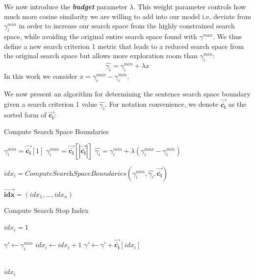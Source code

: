 \documentclass[12pt]{article}
\begin{document}
We now introduce the \textit{\textbf{budget}} parameter $\lambda$. This weight parameter controls how much more cosine similarity we are willing to add into our model i.e. deviate from $\gamma_{i}^{min}$ in order to increase our search space from the highly constrained search space, while avoiding the original entire search space found with $\gamma^{max}$. We thus define a new search criterion 1 metric that leads to a reduced search space from the original search space but allows more exploration room than $\gamma_{i}^{min}$: \[\hat{\gamma_{i}} = \gamma_{i}^{min} + \lambda x\]
In this work we consider $x = \gamma_{i}^{max}-\gamma_{i}^{min}$.

We now present an algorithm for determining the sentence search space boundary given a search criterion 1 value $\hat{\gamma_{i}}$. For notation convenience, we denote $\bm{\vec{\bar{c_i}}}$ as the sorted form of $\bm{\vec{c_i}}$:

\begin{algorithm}[H]
\caption{Compute Search Space Boundaries}
\begin{algorithmic}[1]
\State$ \gamma_{i}^{min} = \bm{\vec{\bar{c_i}}}[1]$
\State$ \gamma_{i}^{max} = \bm{\vec{\bar{c_i}}}[| \bm{\vec{\bar{c_i}}}|]$
\State$ \hat{\gamma_{i}} = \gamma_{i}^{min} + \lambda(\gamma_{i}^{max} - \gamma_{i}^{min})$

\State $idx_i = \textit{ComputeSearchSpaceBoundaries}(\gamma_{i}^{min}, \hat{\gamma_{i}}, \bm{\vec{\bar{c_i}}})$
 \EndFor




\Return $\bm{\vec{idx}} = (idx_1, ..., idx_n)$
\EndProcedure
\end{algorithmic}
\end{algorithm}

\begin{algorithm}[H]
\caption{Compute Search Stop Index}\label{euclid}
\begin{algorithmic}[1]

\State $idx_i = 1$

\State $\gamma\prime \gets \gamma_{i}^{min}$
\State $idx_i \gets idx_i + 1$
\State $\gamma\prime \gets \gamma\prime + \bm{\vec{\bar{c_i}}}[idx_i]$


\EndWhile
\\
\Return $idx_i$
\EndProcedure
\end{algorithmic}
\end{algorithm}
\end{document}
